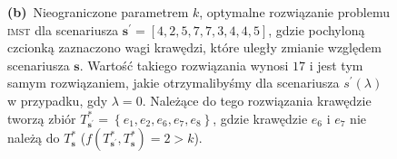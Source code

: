 \begin{figure}[!htbp]
{		\textbf{(b)}~Nieograniczone parametrem $k$, optymalne rozwiązanie problemu \textsc{imst} dla scenariusza $\textbf{s}^{\prime} = \left[ \textit{4}, 2, \textit{5}, 7, \textit{7}, 3, \textit{4}, 4, 5 \right]$, gdzie pochyloną czcionką zaznaczono wagi krawędzi, które uległy zmianie względem scenariusza $\textbf{s}$. Wartość takiego rozwiązania wynosi $17$ i jest tym samym rozwiązaniem, jakie otrzymalibyśmy dla scenariusza $s^{\prime} \left( \lambda \right)$ w przypadku, gdy $\lambda = 0$. Należące do tego rozwiązania krawędzie tworzą zbiór $T^{\ast}_{\textbf{s}^{\prime}} = \left\{ e_{1}, e_{2}, e_{6}, e_{7}, e_{8} \right\}$, gdzie krawędzie $e_{6}$ i $e_{7}$ nie należą do $T^{\ast}_{\textbf{s}}$ ($f \left( T^{\ast}_{\textbf{s}^{\prime}}, T^{\ast}_{\textbf{s}} \right) = 2 > k$).
	}
\end{figure}

